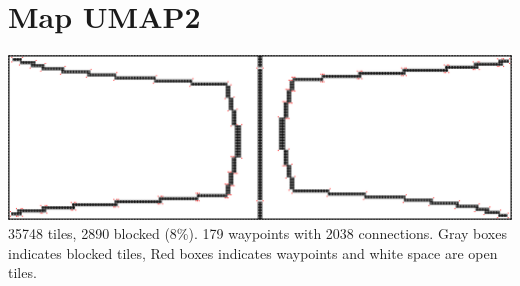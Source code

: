 \documentclass[a4paper]{article}
\begin{document}
\flushleft
\section{Map UMAP2}\label{ap.umap2}
\centering
\includegraphics[width=\textwidth,height=\textheight,keepaspectratio]{ChartsAndFigures/UMAP2.png}
35748 tiles, 2890 blocked (8\%). 179 waypoints with 2038 connections. Gray boxes indicates blocked tiles, Red boxes indicates waypoints and white space are open tiles.
\end{document}
